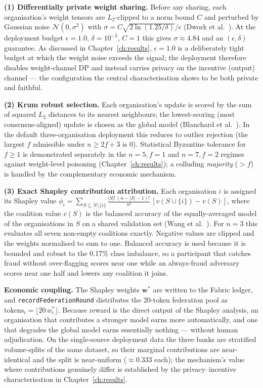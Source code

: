 \medskip
\textbf{(1) Differentially private weight sharing.}
Before any sharing, each organisation's weight tensors are $L_2$-clipped to a norm bound $C$ and perturbed by Gaussian noise $\mathcal{N}(0,\sigma^2)$ with $\sigma = C\sqrt{2\ln(1.25/\delta)}/\epsilon$ (Dwork et al.~\cite{dwork2006}). At the deployment budget $\epsilon=1.0$, $\delta=10^{-5}$, $C=1$ this gives $\sigma\approx 4.84$ and an $(\epsilon,\delta)$ guarantee. As discussed in Chapter~\ref{ch:results}, $\epsilon=1.0$ is a deliberately tight budget at which the weight noise exceeds the signal; the deployment therefore disables weight-channel DP and instead carries privacy on the incentive (output) channel — the configuration the central characterisation shows to be both private and faithful.

\textbf{(2) Krum robust selection.}
Each organisation's update is scored by the sum of squared $L_2$ distances to its nearest neighbours; the lowest-scoring (most consensus-aligned) update is chosen as the global model (Blanchard et al.~\cite{blanchard2017}). In the default three-organisation deployment this reduces to outlier rejection (the largest $f$ admissible under $n\ge 2f+3$ is $0$). Statistical Byzantine tolerance for $f\ge 1$ is demonstrated separately in the $n=5,f=1$ and $n=7,f=2$ regimes against weight-level poisoning (Chapter~\ref{ch:results}); a colluding \emph{majority} ($>f$) is handled by the complementary economic mechanism.

\textbf{(3) Exact Shapley contribution attribution.}
Each organisation $i$ is assigned its Shapley value $\phi_i = \sum_{S\subseteq N\setminus\{i\}} \frac{|S|!\,(n-|S|-1)!}{n!}\,[v(S\cup\{i\})-v(S)]$, where the coalition value $v(S)$ is the balanced accuracy of the equally-averaged model of the organisations in $S$ on a shared validation set (Wang et al.~\cite{wang2020fedsv}). For $n=3$ this evaluates all seven non-empty coalitions exactly. Negative values are clipped and the weights normalised to sum to one. Balanced accuracy is used because it is bounded and robust to the 0.17\% class imbalance, so a participant that catches fraud without over-flagging scores near one while an always-fraud adversary scores near one half and lowers any coalition it joins.

\textbf{Economic coupling.}
The Shapley weights $\mathbf{w}^\ast$ are written to the Fabric ledger, and \texttt{recordFederationRound} distributes the 20-token federation pool as $\text{tokens}_i = \lfloor 20\, w_i^\ast \rfloor$. Because reward is the direct output of the Shapley analysis, an organisation that contributes a stronger model earns more automatically, and one that degrades the global model earns essentially nothing — without human adjudication. On the single-source deployment data the three banks are stratified volume-splits of the same dataset, so their marginal contributions are near-identical and the split is near-uniform ($\approx 0.333$ each); the mechanism's value where contributions genuinely differ is established by the privacy--incentive characterisation in Chapter~\ref{ch:results}.

